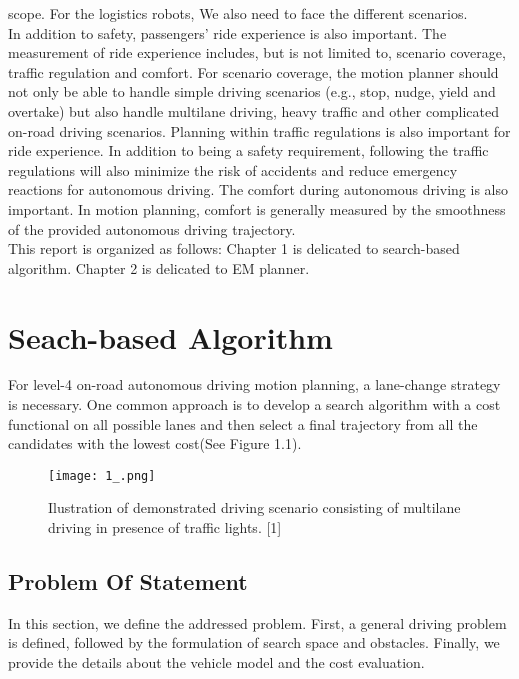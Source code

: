 \documentclass{report}
\begin{document}
 scope. For the logistics robots, We also need to face the different scenarios.\\
 \indent
 In addition to safety, passengers’ ride experience is also important. The measurement of ride experience includes, but is not limited to, scenario coverage, traffic regulation and comfort. For scenario coverage, the motion planner should not only be able to handle simple driving scenarios (e.g., stop, nudge, yield and overtake) but also handle multilane driving, heavy traffic and other complicated on-road driving scenarios.
 Planning within traffic regulations is also important for ride experience. In addition to being a safety requirement, following the traffic regulations will also minimize the risk of accidents and reduce emergency reactions for autonomous driving. The comfort during autonomous driving is also important. In motion planning, comfort is generally measured by the smoothness of the provided autonomous driving trajectory.\\
 \indent
 This report is organized as follows: Chapter 1 is delicated to search-based algorithm. Chapter 2 is delicated to EM planner.
 
 
 \chapter{Seach-based Algorithm}
 For level-4 on-road autonomous driving motion planning, a lane-change strategy is necessary. One common approach is to develop a search algorithm with a cost functional on all possible lanes and then
 select a final trajectory from all the candidates with the lowest cost(See Figure 1.1).
 \begin{figure}[ht]
 	\centering
 	\texttt{[image: 1\_.png]}
 	\caption{Ilustration of demonstrated driving scenario consisting of multilane driving in presence of traffic lights. [1]}
 	\label{fig:1.1} 
 \end{figure}
 \section{Problem Of Statement}
 In this section, we define the addressed problem. First, a general driving problem is defined, followed by the formulation of search space and obstacles. Finally, we provide the details about the vehicle model and the cost evaluation.
\end{document}
